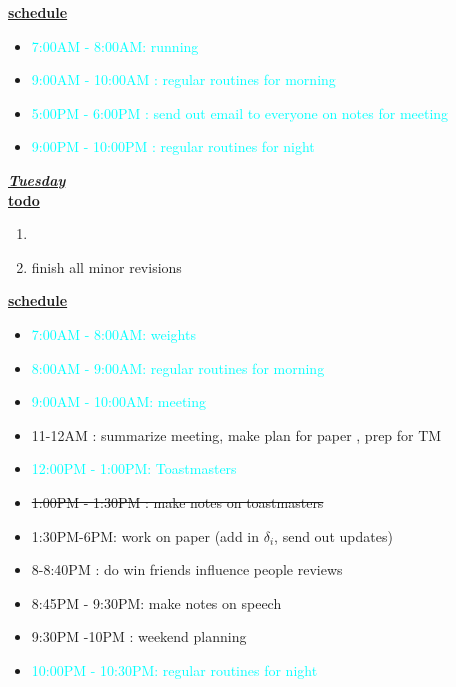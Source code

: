 \documentclass[11pt]{article}
\newcommand{\doneTask}[1]{\item \sout{#1}}
\newcommand{\regItem}[1]{\item \textcolor{cyan}{#1}}
\begin{document}
\underline{\textbf{schedule}}\\
\begin{itemize}
\regItem{7:00AM - 8:00AM: running}
\regItem{9:00AM - 10:00AM : regular routines for morning}
\regItem{5:00PM - 6:00PM : send out email to everyone on notes for meeting}
\regItem{9:00PM - 10:00PM : regular routines for night}
\end{itemize}

\underline{\textbf{\textit{Tuesday}}}\\
\underline{\textbf{todo}}\\
\begin{enumerate}
\item
\item finish all minor revisions

\end{enumerate}

\underline{\textbf{schedule}}\\
\begin{itemize}
\regItem{7:00AM - 8:00AM: weights}
\regItem {8:00AM - 9:00AM: regular routines for morning}
\regItem {9:00AM - 10:00AM: meeting}
\item 11-12AM :  summarize meeting, make plan for paper , prep for TM
\regItem {12:00PM - 1:00PM: Toastmasters}
\doneTask{ 1:00PM - 1:30PM : make notes on toastmasters}
\item 1:30PM-6PM:  work on paper (add in $\delta_i$,  send  out updates)
\item 8-8:40PM :  do win friends influence people reviews
\item 8:45PM - 9:30PM: make notes on speech
\item 9:30PM -10PM : weekend planning
\regItem {10:00PM - 10:30PM: regular routines for night}
\end{itemize}
\end{document}
